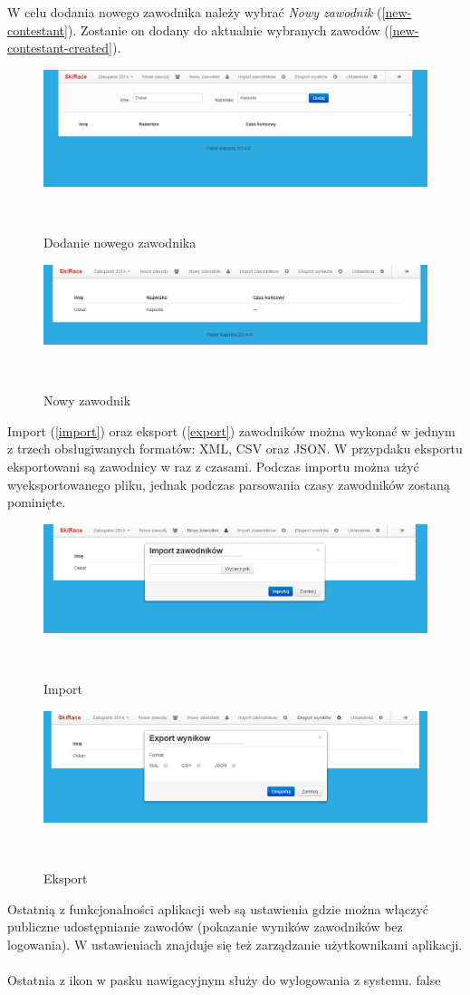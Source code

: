 \documentclass[11pt,a4paper, twoside]{article}
\begin{document}
\noindent
W celu dodania nowego zawodnika należy wybrać \emph{Nowy zawodnik} (\ref{new-contestant}). Zostanie on dodany do aktualnie wybranych zawodów (\ref{new-contestant-created}).
\begin{figure}[H]
\centering
\includegraphics[scale=0.3]{./img/newcontestant.png}
\caption{Dodanie nowego zawodnika}
$\label{new-contestant}$
\end{figure}
\begin{figure}[H]
\centering
\includegraphics[scale=0.3]{./img/newcontestant-created.png}
\caption{Nowy zawodnik}
$\label{new-contestant-created}$
\end{figure}
\noindent
Import (\ref{import}) oraz eksport (\ref{export}) zawodników można wykonać w jednym z trzech obsługiwanych formatów: XML, CSV oraz JSON. W przypdaku eksportu eksportowani są zawodnicy w raz z czasami. Podczas importu można użyć wyeksportowanego pliku, jednak podczas parsowania czasy zawodników zostaną pominięte.
\begin{figure}[H]
\centering
\includegraphics[scale=0.3]{./img/import.png}
\caption{Import}
$\label{import}$
\end{figure}
\begin{figure}[H]
\centering
\includegraphics[scale=0.3]{./img/export.png}
\caption{Eksport}
$\label{export}$
\end{figure}
\noindent
Ostatnią z funkcjonalności aplikacji web są ustawienia gdzie można włączyć publiczne udostępnianie zawodów (pokazanie wyników zawodników bez logowania). W ustawieniach znajduje się też zarządzanie użytkownikami aplikacji.
\\
\\
\noindent
Ostatnia z ikon w pasku nawigacyjnym służy do wylogowania z systemu.
\if false
\newpage
\end{document}
